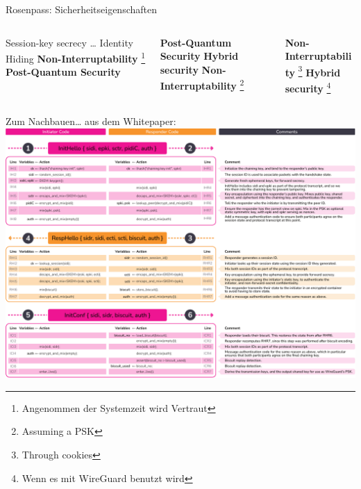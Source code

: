 \documentclass{rosenpass-beamer}
\begin{document}
\begin{frame}{Rosenpass: Sicherheitseigenschaften}

\vspace{0.5em}
\begin{columns}[t]
\begin{column}{.30\textwidth}
\begin{itemize}
  \itemtick Session-key secrecy
  \itemtick \dots
  \itemtick Identity Hiding
  \itemfail \textbf{Non-Interruptability} \footnote[frame]{Angenommen der Systemzeit wird Vertraut}
  \itemfail \textbf{Post-Quantum Security}
\end{itemize}
\end{column}

\begin{column}{.30\textwidth}
\begin{itemize}
  \itemtick \textbf{Post-Quantum Security}
  \itemfail \textbf{Hybrid security}
  \itemfail \textbf{Non-Interruptability} \footnote[frame]{Assuming a PSK}
\end{itemize}
\end{column}

\begin{column}{.30\textwidth}
\begin{itemize}
  \itemtick \textbf{Non-Interruptability} \footnote[frame]{Through cookies}
  \itemtick \textbf{Hybrid security} \footnote[frame]{Wenn es mit WireGuard benutzt wird}
\end{itemize}
\end{column}

\end{columns}
\vspace{1.5em}

\end{frame}

\begin{frame}{Zum Nachbauen… aus dem Whitepaper:}
  \includegraphics[height=.9\textheight]{graphics/rosenpass-wp-message-handling-code.pdf}
\end{frame}
\end{document}
